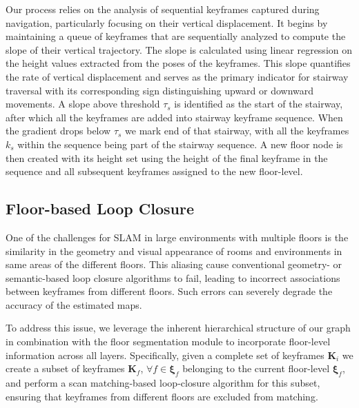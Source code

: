 Our process relies on the analysis of sequential keyframes captured during navigation, particularly focusing on their vertical displacement. 
It begins by maintaining a queue of keyframes that are sequentially analyzed to compute the slope of their vertical trajectory. The slope is calculated using linear regression on the height values extracted from the poses of the keyframes. This slope quantifies the rate of vertical displacement and serves as the primary indicator for stairway traversal with its corresponding sign distinguishing upward or downward movements. A slope above threshold $\tau_s$ is identified as the start of the stairway, after which all the keyframes are added into stairway keyframe sequence. When the gradient drops below $\tau_s$ we mark end of that stairway, with all the keyframes $k_s$ within the sequence being part of the stairway sequence. A new floor node is then created with its height set using the height of the final keyframe in the sequence and all subsequent keyframes assigned to the new floor-level. 


\subsection{Floor-based Loop Closure}
One of the challenges for SLAM in large environments with multiple floors is the similarity in the geometry and visual appearance of rooms and environments in same areas of the different floors. This aliasing cause conventional geometry- or semantic-based loop closure algorithms to fail, leading to incorrect associations between keyframes from different floors. Such errors can severely degrade the accuracy of the estimated maps.

To address this issue, we leverage the inherent hierarchical structure of our graph in combination with the floor segmentation module to incorporate floor-level information across all layers. Specifically, given a complete set of keyframes $\boldsymbol{K}_i$ we create a subset of keyframes $\boldsymbol{K}_f$, $\forall f \in \boldsymbol{\xi}_f$ belonging to the current floor-level $ \boldsymbol{\xi}_f$, and perform a scan matching-based loop-closure algorithm \cite{s_graphs+} for this subset, ensuring that keyframes from different floors are excluded from matching. 


